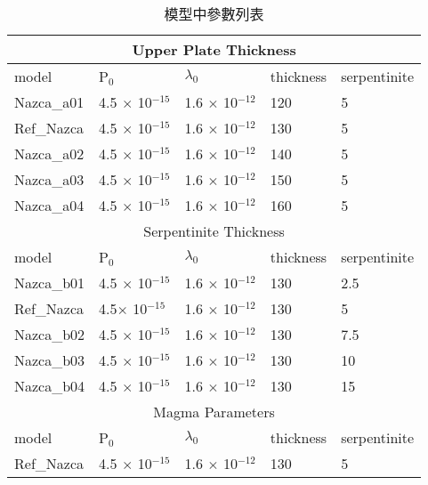 \begin{table}[htp]\large
    \caption[模型參數列表]{模型中參數列表}
    \label{模型參數列表}
    \renewcommand{\arraystretch}{1.2}
    \centering
    \begin{tabular}{|lllll|}
        \hline
        \multicolumn{5}{|c|}{Upper Plate Thickness}                                                 \\ \hline
        model        & P$_0$                   & $\lambda_0$             & thickness & serpentinite \\ \hline
        Nazca\_a01 & 4.5 $\times$ 10$^{-15}$ & 1.6 $\times$ 10$^{-12}$ & 120       & 5            \\
        Ref\_Nazca   & 4.5 $\times$ 10$^{-15}$ & 1.6 $\times$ 10$^{-12}$ & 130       & 5            \\
        Nazca\_a02 & 4.5 $\times$ 10$^{-15}$ & 1.6 $\times$ 10$^{-12}$ & 140       & 5            \\
        Nazca\_a03 & 4.5 $\times$ 10$^{-15}$ & 1.6 $\times$ 10$^{-12}$ & 150       & 5            \\
        Nazca\_a04 & 4.5 $\times$ 10$^{-15}$ & 1.6 $\times$ 10$^{-12}$ & 160       & 5            \\ \hline
        \multicolumn{5}{|c|}{Serpentinite Thickness}                                                \\ \hline
        model        & P$_0$                   & $\lambda_0$             & thickness & serpentinite \\ \hline
        Nazca\_b01 & 4.5 $\times$ 10$^{-15}$ & 1.6 $\times$ 10$^{-12}$ & 130       & 2.5          \\
        Ref\_Nazca   & 4.5$\times$ 10$^{-15}$  & 1.6 $\times$ 10$^{-12}$ & 130       & 5            \\
        Nazca\_b02 & 4.5 $\times$ 10$^{-15}$ & 1.6 $\times$ 10$^{-12}$ & 130       & 7.5          \\
        Nazca\_b03 & 4.5 $\times$ 10$^{-15}$ & 1.6 $\times$ 10$^{-12}$ & 130       & 10           \\
        Nazca\_b04 & 4.5 $\times$ 10$^{-15}$ & 1.6 $\times$ 10$^{-12}$ & 130       & 15           \\ \hline
        \multicolumn{5}{|c|}{Magma Parameters}                                                      \\ \hline
        model        & P$_0$                   & $\lambda_0$             & thickness & serpentinite \\ \hline
        Ref\_Nazca   & 4.5 $\times$ 10$^{-15}$ & 1.6 $\times$ 10$^{-12}$ & 130       & 5            \\

\end{tabular}
\end{table}
